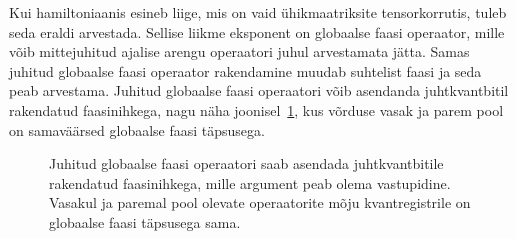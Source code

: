 \documentclass[12pt]{report}
\begin{document}
Kui hamiltoniaanis esineb liige, mis on vaid ühikmaatriksite tensorkorrutis, tuleb seda eraldi arvestada.
Sellise liikme eksponent on globaalse faasi operaator, mille võib mittejuhitud ajalise arengu operaatori juhul arvestamata jätta.
Samas juhitud globaalse faasi operaator rakendamine muudab suhtelist faasi ja seda peab arvestama.
Juhitud globaalse faasi operaatori võib asendanda juhtkvantbitil rakendatud faasinihkega, nagu näha joonisel~\ref{fig:globphase}, kus võrduse vasak ja parem pool on samaväärsed globaalse faasi täpsusega.

\begin{figure}[h]
    \centering
    \ifdefined\yquanton
    \fi
    \caption{Juhitud globaalse faasi operaatori saab asendada juhtkvantbitile rakendatud faasinihkega, mille argument peab olema vastupidine. Vasakul ja paremal pool olevate operaatorite mõju kvantregistrile on globaalse faasi täpsusega sama.}
    \label{fig:globphase}
\end{figure}
\end{document}
